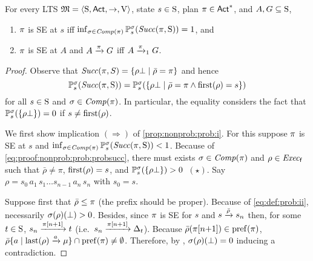 \begin{proposition}\label{prop:nonprob:prob}
  For every LTS $\model=\tup{\S,\Act,\ra,\V}$, state $s\in\S$, plan
  $\plan\in\Act^*$, and $A,G\subseteq\S$,
  \begin{enumerate}
  \item\label{prop:nonprob:prob:i}%
    $\plan$ is SE at $s$ iff
    $\inf_{\strat\in\Comp(\plan)}\Prob^\strat_s(\Succ(\plan,\S))=1$,
    and
  \item\label{prop:nonprob:prob:ii}%
    $\plan$ is SE at $A$ and $A \reach{\plan} G$ iff $A \reach{\plan}_1 G$.
  \end{enumerate}
\end{proposition}
%
\begin{proof}
  Observe that
  $\Succ(\plan,S) = \{{\rho\complete}\mid{\bar{\rho}=\plan}\}$
  and hence
  \begin{equation}\label{eq:proof:nonprob:prob:probsucc}
    \textstyle
    \Prob^\strat_s(\Succ(\plan,\S)) =
    \Prob^\strat_s(\{{\rho\complete}\mid{\bar{\rho}=\plan}\wedge{\first(\rho)=s}\})
  \end{equation}
  for all $s\in\S$ and $\strat\in\Comp(\plan)$. In particular, the
  equality considers the fact that
  $\Prob^\strat_s(\{\rho\complete\})=0$ if $s\neq\first(\rho)$.

  We first show implication $(\Rightarrow)$ of
  \cref{prop:nonprob:prob:i}.
  For this suppose $\plan$ is SE at $s$ and
  $\inf_{\strat\in\Comp(\plan)}\Prob^\strat_s(\Succ(\plan,\S))<1$.
  Because of \cref{eq:proof:nonprob:prob:probsucc}, there must exists
  $\strat\in\Comp(\plan)$ and $\rho\in\execf$ such that
  $\bar{\rho}\neq\pi$, $\first(\rho)=s$, and
  $\Prob^\strat_s(\{\rho\complete\})>0$~$(\star)$.
  Say $\rho=s_0\, a_1\, s_1\ldots s_{n-1}\, a_n\, s_n$ with $s_0=s$.

  Suppose first that $\bar{\rho}\leq\plan$ (the prefix should be
  proper).  Because of \cref{eq:def:prob:ii}, necessarily
  $\strat(\rho)(\complete) > 0$.  Besides, since $\plan$ is SE for $s$
  and $s\reach{\bar{\rho}}s_n$ then, for some $t\in\S$,
  $s_n\reach{\plan[n{+}1]}t$ (i.e.\ $s_n\reach{\plan[n{+}1]}\Dirac_t$).
  Because $\bar{\rho}(\plan[n{+}1])\in\pref(\plan)$,
  $\bar{\rho}\{a\mid{\last(\rho)\reach{a}\mu}\}\cap\pref(\plan)\neq\emptyset$.
  Therefore, by , $\strat(\rho)(\complete) = 0$
  inducing a contradiction.


\end{proof}
